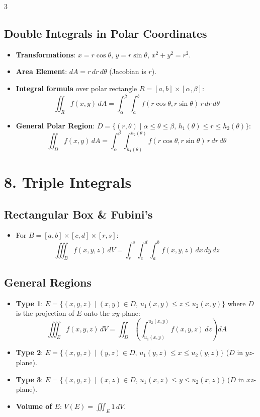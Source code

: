 \documentclass[10pt,landscape,a4paper]{article}
\begin{document}
\begin{multicols*}{3}
\subsection{Double Integrals in Polar Coordinates}
\begin{itemize}
    \item \textbf{Transformations}: $x = r\cos\theta$, $y = r\sin\theta$, $x^2 + y^2 = r^2$.
    \item \textbf{Area Element}: $dA = r\,dr\,d\theta$ (Jacobian is $r$).
    \item \textbf{Integral formula} over polar rectangle $R = [a,b] \times [\alpha, \beta]$:
    \[ \iint_R f(x,y)\,dA = \int_{\alpha}^{\beta} \int_a^b f(r\cos\theta, r\sin\theta)\,r\,dr\,d\theta \]
    \item \textbf{General Polar Region}: $D = \{ (r,\theta) \mid \alpha \leq \theta \leq \beta, \, h_1(\theta) \leq r \leq h_2(\theta) \}$:
    \[ \iint_D f(x,y)\,dA = \int_{\alpha}^{\beta} \int_{h_1(\theta)}^{h_2(\theta)} f(r\cos\theta, r\sin\theta)\,r\,dr\,d\theta \]
\end{itemize}

\section{8. Triple Integrals}
\subsection{Rectangular Box \& Fubini's}
\begin{itemize}
    \item For $B = [a,b] \times [c,d] \times [r,s]$:
    \[ \iiint_B f(x,y,z)\,dV = \int_r^s \int_c^d \int_a^b f(x,y,z)\,dx\,dy\,dz \]
\end{itemize}

\subsection{General Regions}
\begin{itemize}
    \item \textbf{Type 1}: $E = \{ (x,y,z) \mid (x,y) \in D, \, u_1(x,y) \leq z \leq u_2(x,y) \}$ where $D$ is the projection of $E$ onto the $xy$-plane:
    \[ \iiint_E f(x,y,z)\,dV = \iint_D \left( \int_{u_1(x,y)}^{u_2(x,y)} f(x,y,z)\,dz \right) dA \]
    \item \textbf{Type 2}: $E = \{ (x,y,z) \mid (y,z) \in D, \, u_1(y,z) \leq x \leq u_2(y,z) \}$ ($D$ in $yz$-plane).
    \item \textbf{Type 3}: $E = \{ (x,y,z) \mid (x,z) \in D, \, u_1(x,z) \leq y \leq u_2(x,z) \}$ ($D$ in $xz$-plane).
    \item \textbf{Volume of $E$}: $V(E) = \iiint_E 1\,dV$.
\end{itemize}


\end{multicols*}
\end{document}
